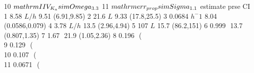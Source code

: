 \begin{Schunk}
\begin{Soutput}
10                                                                    $\\mathrm{IIV_{K_{a}}\\sim \\Omega_{3.3}}$
11                                                                     $\\mathrm{err_{prop}\\sim \\Sigma_{1.1}}$
                 estimate prse              CI
1            8.58 $ L/h $ 9.51     (6.91,9.85)
2              21.6 $ L $ 9.33     (17.8,25.5)
3        0.0684 $ h^-1  $ 8.04  (0.0586,0.079)
4            3.78 $ L/h $ 13.5     (2.96,4.94)
5               107 $ L $ 15.7      (86.2,151)
6              0.999 $  $ 13.7    (0.807,1.35)
7               1.67 $  $ 21.9     (1.05,2.36)
8   0.196 $  $ (\\%CV=NA) 23.1   (0.117,0.257)
9   0.129 $  $ (\\%CV=NA) 30.4  (0.0645,0.186)
10  0.107 $  $ (\\%CV=NA) 25.2  (0.0649,0.152)
11 0.0671 $  $ (\\%CV=NA) 11.4 (0.0563,0.0811)
\end{Soutput}
\end{Schunk}
%
